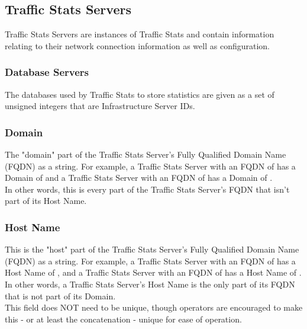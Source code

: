 %
%

\subsection{Traffic Stats Servers}
Traffic Stats Servers are instances of Traffic Stats and contain information
relating to their network connection information as well as configuration.

\subsubsection{Database Servers}
The databases used by Traffic Stats to store statistics are given as a set of
unsigned integers that are Infrastructure Server IDs.

\subsubsection{Domain}
The "domain" part of the Traffic Stats Server's Fully Qualified Domain Name
(FQDN) as a string. For example, a Traffic Stats Server with an FQDN of
 has a Domain of  and a Traffic Stats Server with an
FQDN of  has a Domain of .\\
In other words, this is every part of the Traffic Stats Server's FQDN that
isn't part of its Host Name.

\subsubsection{Host Name}
This is the "host" part of the Traffic Stats Server's Fully Qualified Domain
Name (FQDN) as a string. For example, a Traffic Stats Server with an FQDN of
 has a Host Name of , and a Traffic Stats Server
with an FQDN of  has a Host Name of
.\\
In other words, a Traffic Stats Server's Host Name is the only part of its FQDN
that is not part of its Domain.\\
This field does NOT need to be unique, though operators are encouraged to make
this - or at least the concatenation  -
unique for ease of operation.

